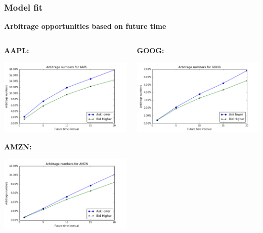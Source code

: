 \documentclass[xcolor={x11names,svgnames,dvipsnames}]{beamer}
\begin{document}
\begin{frame}
\frametitle{Model fit}
\textbf{Arbitrage opportunities based on future time}
\begin{columns}		
		\begin{column}{.5\textwidth}
		   \textbf{AAPL:}

						\includegraphics[width=1\textwidth, height=0.4\textheight]{AAPL_arbitrage_time.png}

			 \textbf{AMZN:}

									\includegraphics[width=1\textwidth, height=0.4\textheight]{AMZN_arbitrage_time.png}

		\end{column}
		\begin{column}{.5\textwidth}
			 \textbf{GOOG:}

									\includegraphics[width=1\textwidth, height=0.4\textheight]{GOOG_arbitrage_time.png}


\end{column}
\end{columns}
\end{frame}
\end{document}
